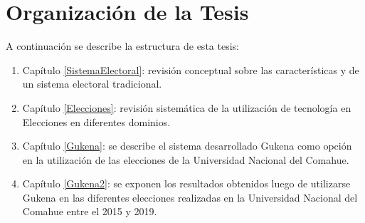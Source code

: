 

\section{Organización de la Tesis}
A continuación se describe la estructura de esta tesis:
\begin{enumerate}
    \item Capítulo \ref{SistemaElectoral}: revisión conceptual sobre las características y  
    de un sistema electoral tradicional.
    \item Capítulo \ref{Elecciones}: revisión sistemática de la utilización de tecnología en  Elecciones en diferentes dominios.
    \item Capítulo \ref{Gukena}: se describe el sistema desarrollado Gukena como opción en la utilización de las elecciones de la Universidad Nacional del Comahue.
    \item Capítulo \ref{Gukena2}: se exponen los resultados obtenidos luego de utilizarse Gukena en las diferentes elecciones realizadas en la Universidad Nacional del Comahue entre el 2015 y 2019.
\end{enumerate}

